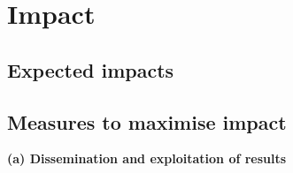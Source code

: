 \chapter{Impact}\label{chap:impact}


\section{Expected impacts}\label{sec:expected-impact}

  
  
  
  






\section{Measures to maximise impact}

{\bf (a) Dissemination and exploitation of results}

